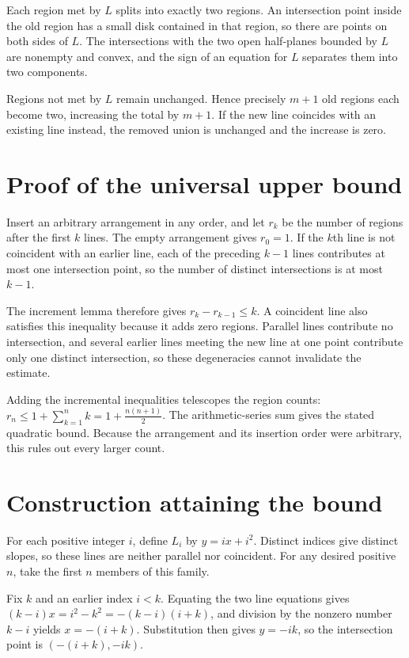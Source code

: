 \documentclass[11pt]{article}
\begin{document}
Each region met by $L$ splits into exactly two regions. An intersection point inside the old region has a small disk contained in that region, so there are points on both sides of $L$. The intersections with the two open half-planes bounded by $L$ are nonempty and convex, and the sign of an equation for $L$ separates them into two components.

Regions not met by $L$ remain unchanged. Hence precisely $m+1$ old regions each become two, increasing the total by $m+1$. If the new line coincides with an existing line instead, the removed union is unchanged and the increase is zero.

\section{Proof of the universal upper bound}
Insert an arbitrary arrangement in any order, and let $r_k$ be the number of regions after the first $k$ lines. The empty arrangement gives $r_0=1$. If the $k$th line is not coincident with an earlier line, each of the preceding $k-1$ lines contributes at most one intersection point, so the number of distinct intersections is at most $k-1$.

The increment lemma therefore gives $r_k-r_{k-1}\leq k$. A coincident line also satisfies this inequality because it adds zero regions. Parallel lines contribute no intersection, and several earlier lines meeting the new line at one point contribute only one distinct intersection, so these degeneracies cannot invalidate the estimate.

Adding the incremental inequalities telescopes the region counts: $r_n\leq1+\sum_{k=1}^{n}k=1+\frac{n(n+1)}{2}$. The arithmetic-series sum gives the stated quadratic bound. Because the arrangement and its insertion order were arbitrary, this rules out every larger count.

\section{Construction attaining the bound}
For each positive integer $i$, define $L_i$ by $y=ix+i^2$. Distinct indices give distinct slopes, so these lines are neither parallel nor coincident. For any desired positive $n$, take the first $n$ members of this family.

Fix $k$ and an earlier index $i<k$. Equating the two line equations gives $(k-i)x=i^2-k^2=-(k-i)(i+k)$, and division by the nonzero number $k-i$ yields $x=-(i+k)$. Substitution then gives $y=-ik$, so the intersection point is $(-(i+k),-ik)$.
\end{document}
